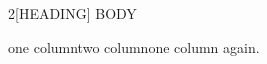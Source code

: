 \documentclass{article}
\begin{document}
\begin{multicols}{2}[HEADING]
BODY
\end{multicols}


one column\twocolumn[head?]two column\onecolumn one column again.
\end{document}
